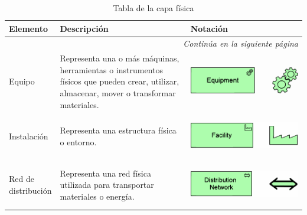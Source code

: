 \begin{longtable}{|p{0.15\linewidth}|p{0.45\linewidth}|p{0.4\linewidth} |}
    \caption{Tabla de la capa física}
    \\
    \hline
    \rowcolor[HTML]{AFC5F6} 
    \textbf{Elemento} & \textbf{Descripción} & \textbf{Notación} \\
    \hline
    \endhead
    \hline
    \multicolumn{3}{r}{\textit{Continúa en la siguiente página}} \\
    \endfoot
    \hline
    \endlastfoot
    \label{tab:Tabla de la capa física}



    Equipo
    &
    Representa una o más máquinas, herramientas 
    o instrumentos físicos que pueden crear, utilizar, 
    almacenar, mover o transformar materiales.
    &
\begin{center}
    \includegraphics[width=0.8\linewidth]{imgs/capa_fisica/Equipment.pdf}
\end{center} 
    \\ \hline



    Instalación
    &
    Representa una estructura física o entorno.
    &
\begin{center}
    \includegraphics[width=0.8\linewidth]{imgs/capa_fisica/Facility.pdf}
\end{center} 
    \\ \hline



    Red de distribución
    &
    Representa una red física utilizada para 
    transportar materiales o energía.
    &
\begin{center}
    \includegraphics[width=0.8\linewidth]{imgs/capa_fisica/Distribution network.pdf}
\end{center} 
    \\ \hline




\end{longtable}
